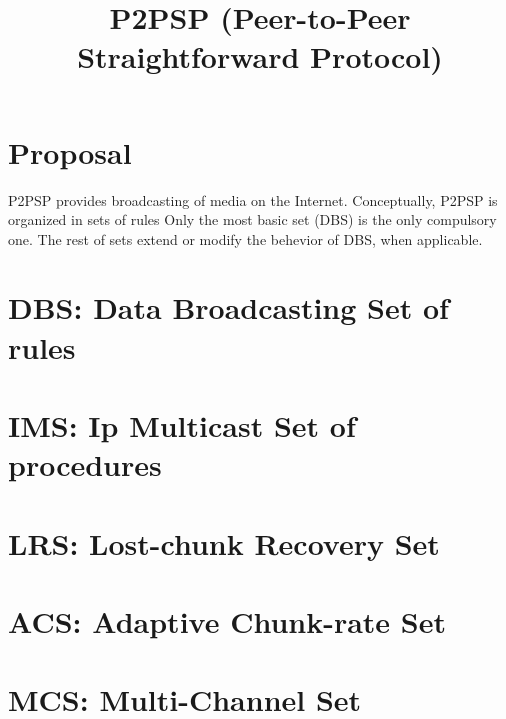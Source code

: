 \title{P2PSP (Peer-to-Peer Straightforward Protocol)}
\maketitle
\tableofcontents

\section{Proposal}
\label{sec:proposal}

P2PSP provides broadcasting of media on the Internet.  Conceptually,
P2PSP is organized in sets of rules Only the most basic set (DBS) is
the only compulsory one. The rest of sets extend or modify the
behevior of DBS, when applicable.

\section{DBS: Data Broadcasting Set of rules}
\label{sec:DBL}


\section{IMS: Ip Multicast Set of procedures}
\label{sec:IMS}


\section{LRS: Lost-chunk Recovery Set}
\label{sec:LRS}


\section{ACS: Adaptive Chunk-rate Set}
\label{sec:ACS}


\section{MCS: Multi-Channel Set}
\label{sec:MCS}



